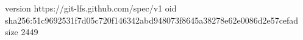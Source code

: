 version https://git-lfs.github.com/spec/v1
oid sha256:51c9692531f7d05c720f146342abd948073f8645a38278e62e0086d2e57cefad
size 2449
